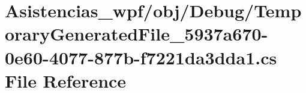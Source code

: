 \hypertarget{_asistencias__wpf_2obj_2_debug_2_temporary_generated_file__5937a670-0e60-4077-877b-f7221da3dda1_8cs}{\section{Asistencias\-\_\-wpf/obj/\-Debug/\-Temporary\-Generated\-File\-\_\-5937a670-\/0e60-\/4077-\/877b-\/f7221da3dda1.cs File Reference}
\label{_asistencias__wpf_2obj_2_debug_2_temporary_generated_file__5937a670-0e60-4077-877b-f7221da3dda1_8cs}
}
